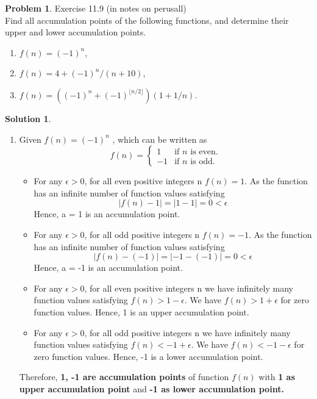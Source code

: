 \documentclass{article}
\theoremstyle{definition}
\newtheorem{problem}{Problem}
\newtheorem*{solution}{Solution}
\begin{document}
\begin{problem}
Exercise 11.9 (in notes on perusall) \\
Find all accumulation points of the following functions, and determine their upper and lower accumulation points.
\begin{enumerate}[label=(\alph*)]
\item $f(n) = (-1)^n$,
\item $f(n) = 4 + (-1)^n/(n+10)$,
\item $f(n) = ((-1)^n+(-1)^{\lfloor{n/2}\rfloor})(1 + 1/n)$.
\end{enumerate}
\begin{solution}
\begin{enumerate}[label=(\Alph*)]
\item Given $f(n) = (-1)^n$ , which can be written as 
\begin{equation}
  f(n)=\begin{cases}
    1 & \text{if $n$ is even}.\\
    -1 & \text{if $n$ is odd}.
  \end{cases}
\end{equation}
\begin{itemize}
  \item For any $\epsilon > 0$, for all even positive integers n $f(n) = 1$. As the function has an infinite number of function values satisfying $$|f(n) - 1| = |1-1| = 0 < \epsilon$$ Hence, a = 1 is an accumulation point.
  \item For any $\epsilon > 0$, for all odd positive integers n $f(n) = -1$. As the function has an infinite number of function values satisfying $$|f(n) - (-1)| = |-1-(-1)| = 0 < \epsilon$$ Hence, a = -1 is an accumulation point.
  \item For any $\epsilon > 0$, for all even positive integers n we have infinitely many function values satisfying $f(n) > 1 - \epsilon$. We have $f(n) > 1 + \epsilon$ for zero function values. Hence, 1 is an upper accumulation point.
  \item For any $\epsilon > 0$, for all odd positive integers n we have infinitely many function values satisfying $f(n) < -1 + \epsilon$. We have $f(n) < -1 - \epsilon$ for zero function values. Hence, -1 is a lower accumulation point.
\end{itemize}
Therefore, \textbf{1, -1 are accumulation points} of function $f(n)$ with \textbf{1 as upper accumulation point} and \textbf{-1 as lower accumulation point.}


\end{enumerate}
\end{solution}
\end{problem}
\end{document}
